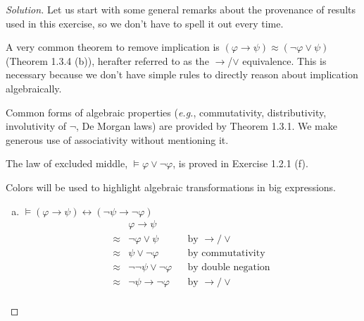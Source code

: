 \documentclass[letter]{article}
\theoremstyle{definition}
\newenvironment{solution}
{\begin{proof}[Solution]}
        {\end{proof}}
\renewcommand{\phi}{\varphi}
\begin{document}
\begin{solution}
\newcommand*\tolor{{$\to$/$\lor$}}
\newcommand*\colop[2]{\mathbin{\color{#1}#2}} %
%
Let us start with some general remarks about the provenance of results used in
this exercise, so we don't have to spell it out every time.

A very common theorem to remove implication is
$(\phi \to \psi) \approx (\neg\phi \lor \psi)$
(Theorem 1.3.4 (b)), herafter referred to as the \tolor{} equivalence.
This is necessary because we don't have simple rules to directly reason about
implication algebraically.

Common forms of algebraic properties (\textit{e.g.}, commutativity,
distributivity, involutivity of $\neg$, De Morgan laws) are provided by
Theorem 1.3.1. We make generous use of associativity without mentioning it.

The law of excluded middle, $\models \phi \lor \neg \phi$,
is proved in Exercise 1.2.1 (f).

Colors will be used to highlight algebraic transformations in big expressions.

\begin{enumerate}[(a)]
  \item $\models (\phi \to \psi) \leftrightarrow (\neg \psi \to \neg \phi)$
\begin{align*}
  & \phi \to \psi && \\
\approx{} & \neg \phi \lor \psi     && \text{by \tolor{}} \\
\approx{} & \psi \lor \neg \phi     && \text{by commutativity} \\
\approx{} & \neg \neg \psi \lor \neg \phi  && \text{by double negation} \\
\approx{} & \neg \psi \to \neg \phi && \text{by \tolor{}} \\
\end{align*}


\end{enumerate}
\end{solution}
\end{document}
